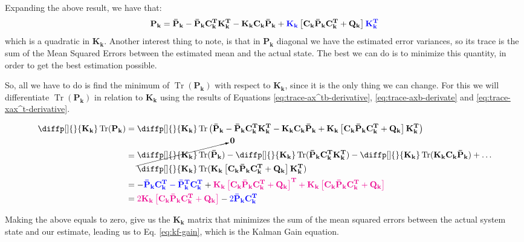 \documentclass[12pt]{article}
\newcommand{\mat}[1]{\mathbf{#1}}
\newcommand{\matT}[1]{\mathbf{#1^T}}
\newcommand{\brac}[1]{\left[#1\right]} %
\newcommand{\parentheses}[1]{\left(#1\right)}
\DeclareMathOperator{\Tr}{Tr}
\newcommand{\blue}[1]{\color{blue}#1\color{black}}
\newcommand{\magenta}[1]{\color{magenta}#1\color{black}}
\begin{document}
Expanding the above result, we have that:
\begin{equation*}
    \mat{P_k} = \mat{\bar{P}_k} - \mat{\bar{P}_k}\matT{C_k}\matT{K_k} - \mat{K_k C_k \bar{P}_k} +  \blue{\mat{K_k}}\brac{\mat{C_k}\mat{\bar{P}_k}\matT{C_k} + \mat{Q_k}}\blue{\matT{K_k}}
\end{equation*}
which is a quadratic in $\mat{K_k}$. Another interest thing to note, is that in $\mat{P_k}$ diagonal we have the estimated error variances, so its trace is the sum of the Mean Squared Errors between the estimated mean and the actual state. The best we can do is to minimize this quantity, in order to get the best estimation possible. 

So, all we have to do is find the minimum of $\Tr(\mat{P_k})$ with respect to $\mat{K_k}$, since it is the only thing we can change. For this we will differentiate $\Tr(\mat{P_k})$ in relation to $\mat{K_k}$ using the results of Equations \ref{eq:trace-ax^tb-derivative}, \ref{eq:trace-axb-derivate} and \ref{eq:trace-xax^t-derivative}.

\begin{equation*}
   \begin{aligned}
       \diffp[]{}{\mat{K_k}}\Tr(\mat{P_k}) &= \diffp[]{}{\mat{K_k}} \Tr\parentheses{\mat{\bar{P}_k} - \mat{\bar{P}_k}\matT{C_k}\matT{K_k} - \mat{K_k C_k \bar{P}_k} +  \mat{K_k}\brac{\mat{C_k}\mat{\bar{P}_k}\matT{C_k} + \mat{Q_k}}\matT{K_k}}\\
       &= \begin{aligned}
       &\cancelto{\mat{0}}{\diffp[]{}{\mat{K_k}} \Tr(\mat{\bar{P}_k})} - \diffp[]{}{\mat{K_k}}\Tr(\mat{\bar{P}_k}\matT{C_k}\matT{K_k}) - \diffp[]{}{\mat{K_k}}\Tr(\mat{K_k C_k \bar{P}_k}) + \dots\\ &\diffp[]{}{\mat{K_k}}\Tr(\mat{K_k}\brac{\mat{C_k}\mat{\bar{P}_k}\matT{C_k} + \mat{Q_k}}\matT{K_k})
       \end{aligned}\\
       &= -\blue{\mat{\bar{P}_k}\matT{C_k} - \matT{\bar{P}_k}\matT{C_k}} + \magenta{\mat{K_k}\brac{\mat{C_k}\mat{\bar{P}_k}\matT{C_k} + \mat{Q_k}}^\mathbf{T} + \mat{K_k}\brac{\mat{C_k}\mat{\bar{P}_k}\matT{C_k} + \mat{Q_k}}}\\
       &= \magenta{2 \mat{K_k}\brac{\mat{C_k}\mat{\bar{P}_k}\matT{C_k} + \mat{Q_k}}} - \blue{2 \mat{\bar{P}_k}\matT{C_k}}
   \end{aligned} 
\end{equation*}

Making the above equals to zero, give us the $\mat{K_k}$ matrix that minimizes the sum of the mean squared errors between the actual system state and our estimate, leading us to Eq. \ref{eq:kf-gain}, which is the Kalman Gain equation.
\end{document}
